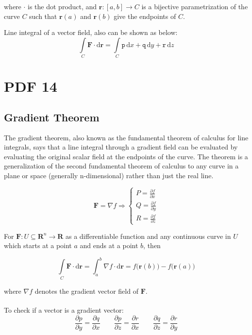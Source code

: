 \documentclass[12pt, fleqn]{book}
\newcommand{\D}{\mathrm{d}}
\newcommand{\ic}{\int\limits_C}
\newcommand{\F}{\mathbf{F}}
\newcommand{\R}{\mathbf{R}}
\newcommand{\br}{\mathbf{r}}
\newcommand{\rond}[2]{\frac{\partial #1}{\partial #2}}
\begin{document}
		where $\cdot$ is the dot product, and $\br \colon [a, b] \to C$ is a bijective parametrization of the curve $C$ such that $\br(a)$ and $\br(b)$ give the endpoints of $C$. 
		
		Line integral of a vector field, also can be shown as below:
		\begin{equation}
			\ic  \F \cdot \D \br = \ic  \mathtt{p} \, \D x + \mathtt{q} \, \D y + \mathtt{r} \, \D z
		\end{equation}    

\chapter{PDF 14}\label{pdf14}
    \section{Gradient Theorem}
	    The gradient theorem, also known as the fundamental theorem of calculus for line integrals, says that a line integral through a gradient field can be evaluated by evaluating the original scalar field at the endpoints of the curve. The theorem is a generalization of the second fundamental theorem of calculus to any curve in a plane or space (generally n-dimensional) rather than just the real line. 
	    
		\begin{equation}
			\F = \nabla f \Rightarrow
			\begin{cases}
				P = \rond{f}{x} \\
				Q = \rond{f}{y} \\
				R = \rond{f}{z} 
			\end{cases}
		\end{equation} 
		
	    For $\F \colon U \subseteq \R^n \to \R$ as a differentiable function and any continuous curve in $U$ which starts at a point $a$ and ends at a point $b$, then 
		
		\begin{equation}
			\ic  \F \cdot \D \br = \int_{a}^{b} \nabla f \cdot \D \br = f\big(\br(b)\big) - f\big(\br(a)\big)
		\end{equation}     
		
		where $\nabla f$ denotes the gradient vector field of $\F$. \\ \\	
			
		To check if a vector is a gradient vector:
		\begin{equation}
			\rond{p}{y} = \rond{q}{x} \qquad
			\rond{p}{z} = \rond{r}{x} \qquad
			\rond{q}{z} = \rond{r}{y}
		\end{equation}
		
\end{document}
